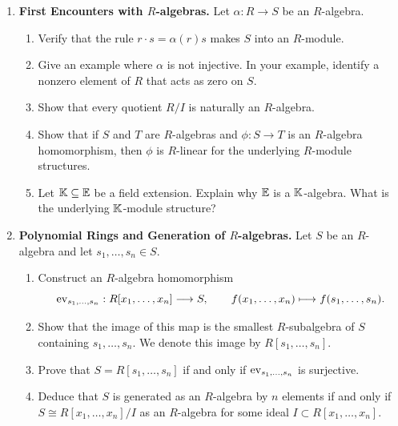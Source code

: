 \documentclass[12pt,reqno]{amsart}
\begin{document}
\hrulefill

\begin{enumerate}[leftmargin=*, series=problems]

\item \textbf{First Encounters with $R$-algebras.} Let $\alpha:R\to S$ be an $R$-algebra.
\begin{enumerate}
    \item Verify that the rule $r\cdot s=\alpha(r)s$ makes $S$ into an $R$-module.
    \item Give an example where $\alpha$ is not injective. In your example, identify a nonzero element of $R$ that acts as zero on $S$.
    \item Show that every quotient $R/I$ is naturally an $R$-algebra.
    \item Show that if $S$ and $T$ are $R$-algebras and $\phi:S\to T$ is an $R$-algebra homomorphism, then $\phi$ is $R$-linear for the underlying $R$-module structures.
    \item Let $\mathbb{K} \subseteq \mathbb{E}$ be a field extension. Explain why $\mathbb{E}$ is a $\mathbb{K}$-algebra. What is the underlying $\mathbb{K}$-module structure?
\end{enumerate}

\item \textbf{Polynomial Rings and Generation of $R$-algebras.} Let $S$ be an $R$-algebra and let $s_1,\ldots,s_n\in S$.
\begin{enumerate}
    \item Construct an $R$-algebra homomorphism
    \[
    \operatorname{ev}_{s_1,\ldots,s_n}:R[x_1,\ldots,x_n]\longrightarrow S,
    \qquad
    f(x_1,\ldots,x_n)\longmapsto f(s_1,\ldots,s_n).
    \]
    \item Show that the image of this map is the smallest $R$-subalgebra of $S$ containing $s_1,\ldots,s_n$. We denote this image by $R[s_1,\ldots,s_n]$.
    \item Prove that $S=R[s_1,\ldots,s_n]$ if and only if $\operatorname{ev}_{s_1,\ldots,s_n}$ is surjective.
    \item Deduce that $S$ is generated as an $R$-algebra by $n$ elements if and only if $S\cong R[x_1,\ldots,x_n]/I$ as an $R$-algebra for some ideal $I \subset R[x_{1},\ldots,x_{n}]$.
\end{enumerate}


\end{enumerate}
\end{document}
